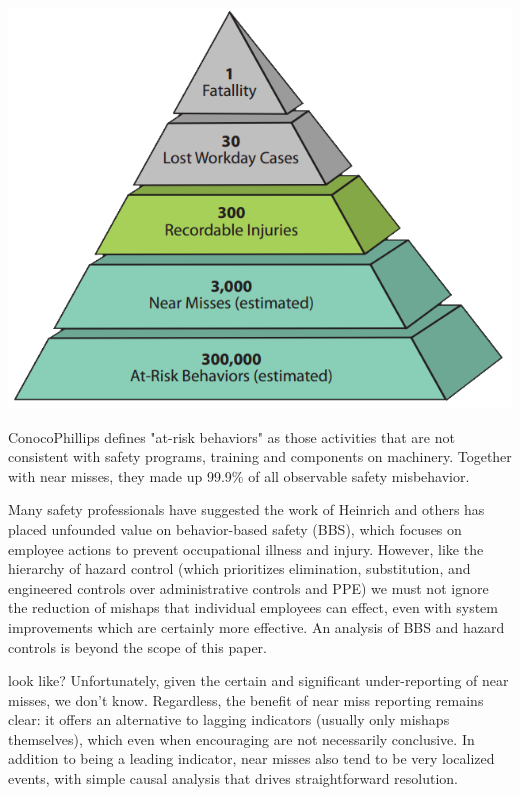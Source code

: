 \documentclass{tufte-handout}
\begin{document}
	\begin{marginfigure}
		\includegraphics[width=\linewidth]{ConocoPyramid}
		\caption{ConocoPhillips defines "at-risk behaviors" as those activities that are not consistent with safety programs, training and components on machinery.  Together with near misses, they made up 99.9\% of all observable safety misbehavior.}
		\label{fig:ConocoPyramid}
	\end{marginfigure}
	Many safety professionals have suggested the work of Heinrich and others has placed unfounded value on behavior-based safety (BBS), which focuses on employee actions to prevent occupational illness and injury.  However, like the hierarchy of hazard control (which prioritizes elimination, substitution, and engineered controls over administrative controls and PPE) we must not ignore the reduction of mishaps that individual employees can effect, even with system improvements which are certainly more effective.  An analysis of BBS and hazard controls is beyond the scope of this paper.
	
	 look like?  Unfortunately, given the certain and significant under-reporting of near misses, we don't know.  Regardless, the benefit of near miss reporting remains clear:  it offers an alternative to lagging indicators (usually only mishaps themselves), which even when encouraging are not necessarily conclusive.  In addition to being a leading indicator, near misses also tend to be very localized events, with simple causal analysis that drives straightforward resolution. 
	
\end{document}
